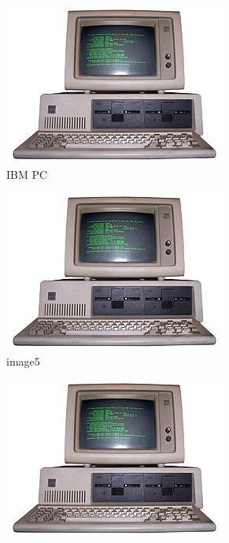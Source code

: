 \documentclass{beamer}
\begin{document}
\begin{frame}[fragile]
\begin{figure}[htb]
\medskip
\begin{subfigure}{0.25\textwidth}
  \includegraphics[width=\linewidth]{ibmpc.jpg}
  \caption{IBM PC}
  \label{fig:4}
\end{subfigure}\hfil 
\begin{subfigure}{0.25\textwidth}
  \includegraphics[width=\linewidth]{ibmpc.jpg}
  \caption{image5}
  \label{fig:5}
\end{subfigure}\hfil 
\begin{subfigure}{0.25\textwidth}
  \includegraphics[width=\linewidth]{ibmpc.jpg}

\end{subfigure}
\end{figure}
\end{frame}
\end{document}
